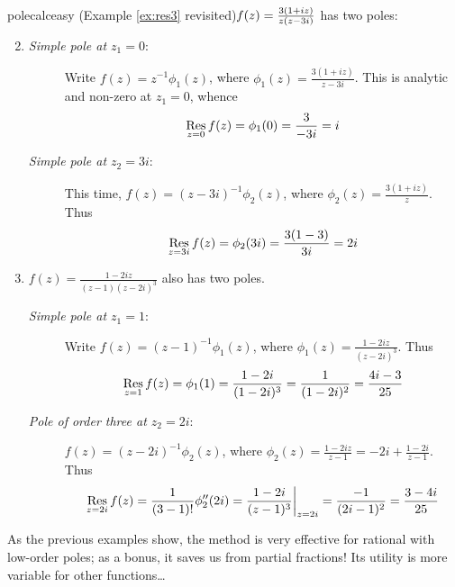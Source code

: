 \begin{examples}{}{polecalceasy}
	\exstart (Example \ref{ex:res3} revisited)\lstsp $f(z)=\smash{\frac{3(1+iz)}{z(z-3i)}}$ has two poles:
	\begin{enumerate}\setcounter{enumi}{1}
		\item[]\begin{description}
			\item[\normalfont\emph{Simple pole at $z_1=0$}:] Write $f(z)=z^{-1}\phi_1(z)$, where $\phi_1(z)=\frac{3(1+iz)}{z-3i}$. This is analytic and non-zero at $z_1=0$, whence
\[\operatorname*{Res}\limits_{z=0}f(z)=\phi_1(0)=\frac 3{-3i}=i\]
			\item[\normalfont\emph{Simple pole at $z_2=3i$}:] This time, $f(z)=(z-3i)^{-1}\phi_2(z)$, where $\phi_2(z)=\frac{3(1+iz)}{z}$. Thus
			\[
				\operatorname*{Res}\limits_{z=3i}f(z)=\phi_2(3i)=\frac{3(1-3)}{3i}=2i
			\]
	  \end{description}
	  
	  \item $f(z)=\frac{1-2iz}{(z-1)(z-2i)^3}$ also has two poles.
	  \begin{description}
			\item[\normalfont\emph{Simple pole at $z_1=1$}:] Write $f(z)=(z-1)^{-1}\phi_1(z)$, where $\phi_1(z)=\frac{1-2iz}{(z-2i)^3}$. Thus 
	    \[
	    	\operatorname*{Res}_{z=1}f(z) =\phi_1(1)
	    	=\frac{1-2i}{(1-2i)^3} =\frac 1{(1-2i)^2}
	    	=\frac{4i-3}{25}
	    \]
			\item[\normalfont\emph{Pole of order three at $z_2=2i$}:] $f(z)=(z-2i)^{-1}\phi_2(z)$, where $\phi_2(z)=\frac{1-2iz}{z-1}=-2i+\frac{1-2i}{z-1}$. Thus
		  \[
		    \operatorname*{Res}_{z=2i}f(z) =\frac 1{(3-1)!}\phi_2''(2i)
		    =\frac{1-2i}{(z-1)^3}\bigg|_{z=2i}
		    =\frac{-1}{(2i-1)^2} =\frac{3-4i}{25}
		  \]
	  \end{description}
	\end{enumerate}
\end{examples}

\goodbreak

As the previous examples show, the method is very effective for rational with low-order poles; as a bonus, it saves us from partial fractions! Its utility is more variable for other functions\ldots

